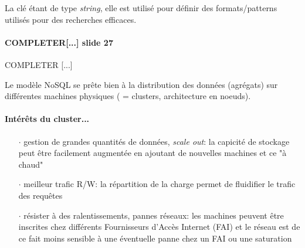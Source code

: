 \item{}
{\faux}
{La clé étant de type \textit{string}, elle est utilisé pour définir des formats/patterns utilisés pour des recherches efficaces.
\paragraph{COMPLETER[...] slide 27}}


\item{}
{}
{COMPLETER [...]}


\item{}
{\vrai}
{Le modèle NoSQL se prête bien à la distribution des données (agrégats) sur différentes machines physiques ( = clusters, architecture en noeuds). 

\paragraph{Intérêts du cluster...} 
\begin{itemize}
\item[$\cdot$] gestion de grandes quantités de données, \textit{scale out}: la capicité de stockage peut être facilement augmentée en ajoutant de nouvelles machines et ce "à chaud" 
\item[$\cdot$] meilleur trafic R/W: la répartition de la charge permet de fluidifier le trafic des requêtes
\item[$\cdot$]résister à des ralentissements, pannes réseaux: les machines peuvent être inscrites chez différents Fournisseurs d'Accès Internet (FAI) et le réseau est de ce fait moins sensible à une éventuelle panne chez un FAI ou une saturation
\end{itemize}
 }



